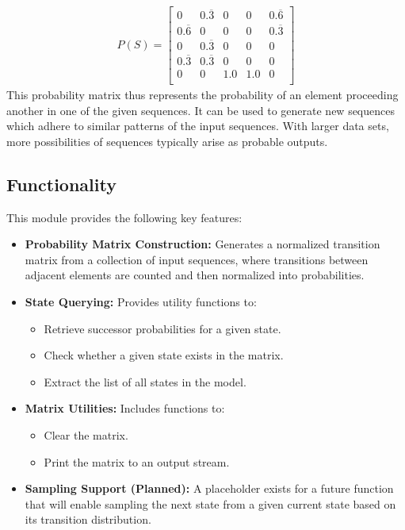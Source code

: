 \begin{align}
P(S) = \left[
\begin{matrix}
0 & 0.\overline{3} & 0 & 0 & 0.\overline{6} \\ 
0.\overline{6} & 0 & 0 & 0 & 0.\overline{3} \\ 
0 & 0.\overline{3} & 0 & 0 & 0 \\ 
0.\overline{3} & 0.\overline{3} & 0 & 0 & 0\\ 
0 & 0 & 1.0 & 1.0 & 0 \\ 
\end{matrix}\right]
\end{align}
This probability matrix thus represents the probability of an element proceeding another in one of the given sequences. It can be used to generate new sequences which adhere to similar patterns of the input sequences. With larger data sets, more possibilities of sequences typically arise as probable outputs. 


\subsection{Functionality}

This module provides the following key features:

\begin{itemize}
    \item \textbf{Probability Matrix Construction:} 
    Generates a normalized transition matrix from a collection of input sequences, where transitions between adjacent elements are counted and then normalized into probabilities.

    \item \textbf{State Querying:}
    Provides utility functions to:
    \begin{itemize}
        \item Retrieve successor probabilities for a given state.
        \item Check whether a given state exists in the matrix.
        \item Extract the list of all states in the model.
    \end{itemize}

    \item \textbf{Matrix Utilities:}
    Includes functions to:
    \begin{itemize}
        \item Clear the matrix.
        \item Print the matrix to an output stream.
    \end{itemize}

    \item \textbf{Sampling Support (Planned):}
    A placeholder exists for a future function that will enable sampling the next state from a given current state based on its transition distribution.
\end{itemize}

